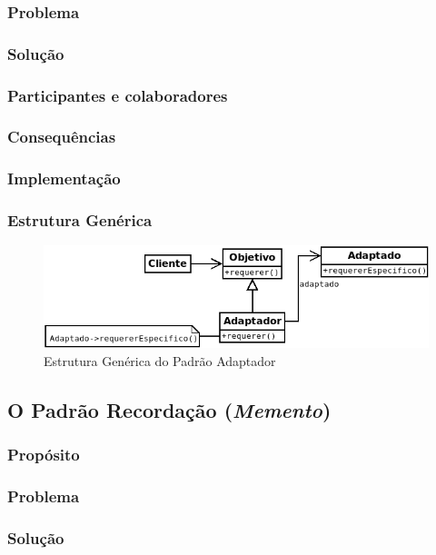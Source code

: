 \subsubsection{Problema}
\subsubsection{Solução}
\subsubsection{Participantes e colaboradores}
\subsubsection{Consequências}
\subsubsection{Implementação}
\subsubsection{Estrutura Genérica}

\begin{figure}[h]
\begin{center}
\includegraphics[scale=0.6]{adaptador.png}
\caption{Estrutura Genérica do Padrão Adaptador}\label{fig:adaptador}
\end{center}
\end{figure}

\subsection{O Padrão Recordação (\textit{Memento})}
\subsubsection{Propósito}
\subsubsection{Problema}
\subsubsection{Solução}
